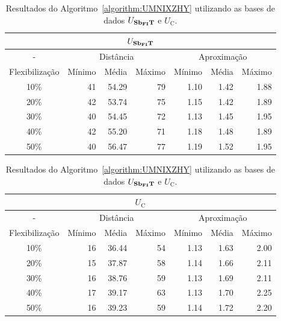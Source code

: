 \begin{table}[!htb]
  \caption{Resultados do Algoritmo~\ref{algorithm:UMNIXZHY} utilizando as bases de dados $U_{\textbf{Sb\textsubscript{FI}T}}{}$ e $U_{\text{C}}$.}
  \label{table:ZQDEMKFX}
  \centering
  \begin{tabular}{|c|r|r|r|r|r|r|}
    \hline
    \multicolumn{7}{|c|}{$U_{\textbf{Sb\textsubscript{FI}T}}{}$}                                                                       \\ \hline
      -            & \multicolumn{3}{c|}{Distância}             & \multicolumn{3}{c|}{Aproximação}           \\ \hline
    Flexibilização & Mínimo       & Média        & Máximo       & Mínimo       & Média        & Máximo       \\ \hline  
    10\%           & 41           & 54.29        & 79           & 1.10         & 1.42         & 1.88         \\ \hline
    20\%           & 42           & 53.74        & 75           & 1.15         & 1.42         & 1.89         \\ \hline
    30\%           & 40           & 54.45        & 72           & 1.13         & 1.45         & 1.95         \\ \hline
    40\%           & 42           & 55.20        & 71           & 1.18         & 1.48         & 1.89         \\ \hline
    50\%           & 40           & 56.47        & 77           & 1.19         & 1.52         & 1.95         \\ \hline    
  \end{tabular}

  \vspace{5mm}

  \begin{tabular}{|c|r|r|r|r|r|r|}
    \hline
    \multicolumn{7}{|c|}{$U_{\text{C}}$}                                                                     \\ \hline
      -            & \multicolumn{3}{c|}{Distância}             & \multicolumn{3}{c|}{Aproximação}           \\ \hline
    Flexibilização & Mínimo       & Média        & Máximo       & Mínimo       & Média        & Máximo       \\ \hline  
    10\%           & 16           & 36.44        & 54           & 1.13         & 1.63         & 2.00         \\ \hline
    20\%           & 15           & 37.87        & 58           & 1.14         & 1.66         & 2.11         \\ \hline
    30\%           & 16           & 38.76        & 59           & 1.13         & 1.69         & 2.11         \\ \hline
    40\%           & 17           & 39.17        & 63           & 1.13         & 1.70         & 2.25         \\ \hline
    50\%           & 16           & 39.23        & 59           & 1.14         & 1.72         & 2.20         \\ \hline    
  \end{tabular}
\end{table}

